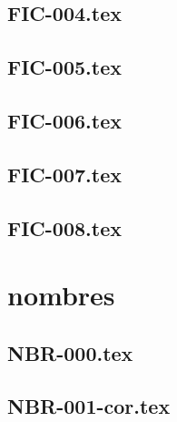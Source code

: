 \renewcommand{\xxexo}{FIC-004.tex} 
\subsection*{\xxexo} 
\graphicspath{{../../exosfichiers/equadiffs/\xxexo/}}
 
 
\renewcommand{\xxexo}{FIC-005.tex} 
\subsection*{\xxexo} 
\graphicspath{{../../exosfichiers/equadiffs/\xxexo/}}
 
 
\renewcommand{\xxexo}{FIC-006.tex} 
\subsection*{\xxexo} 
\graphicspath{{../../exosfichiers/equadiffs/\xxexo/}}
 
 
\renewcommand{\xxexo}{FIC-007.tex} 
\subsection*{\xxexo} 
\graphicspath{{../../exosfichiers/equadiffs/\xxexo/}}
 
 
\renewcommand{\xxexo}{FIC-008.tex} 
\subsection*{\xxexo} 
\graphicspath{{../../exosfichiers/equadiffs/\xxexo/}}
 
 
\section*{nombres}
\renewcommand{\xxexo}{NBR-000.tex} 
\subsection*{\xxexo} 
\graphicspath{{../../exosnombres/equadiffs/\xxexo/}}
 
 
\renewcommand{\xxexo}{NBR-001-cor.tex} 
\subsection*{\xxexo} 
\graphicspath{{../../exosnombres/equadiffs/\xxexo/}}
 
 
